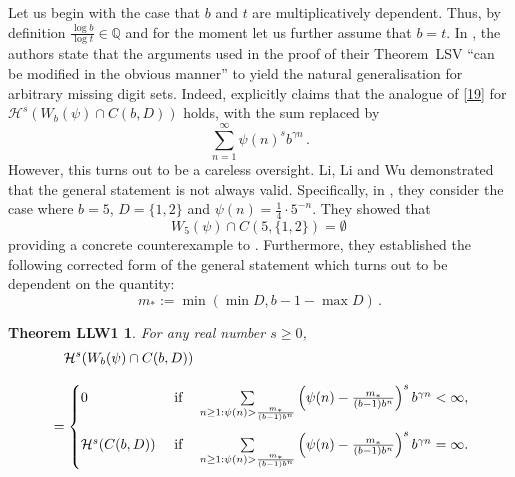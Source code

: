 \documentclass[12pt]{article}
\newtheorem*{llw1thm}{Theorem LLW1}
\theoremstyle{definition}
\theoremstyle{remark}
\begin{document}
Let us begin with the case that $b$ and $t$ are multiplicatively dependent.  Thus,  by definition $\frac{\log b}{\log t}\in\mathbb{Q}$ and for the moment let us further assume that $b=t$. In  \cite[\S7]{LSV2007}, the authors state  that the arguments used in the proof of their  Theorem~LSV ``can be modified in the obvious manner'' to yield the natural generalisation for arbitrary missing digit sets. Indeed, \cite[Theorem~4]{LSV2007} explicitly claims  that the analogue of \eqref{19} for $\mathcal{H}^{s}(W_{b}(\psi)\cap C(b,D))$  holds,  with the  sum  replaced by
 \begin{equation}  \label{sumlsvwrong}
\sum_{n=1}^{\infty}\psi(n)^{s}b^{\gamma n}  \, .  \end{equation}  However,  this turns out to be a careless oversight.
Li, Li and Wu \cite{LLW2025} demonstrated  that the general statement is not always valid.   Specifically, in   \cite[Example 3.1]{LLW2025}, they consider the case where   $b=5$, $D=\{1,2\}$ and $\psi(n)=\frac{1}{4}\cdot5^{-n}$.  They showed that
$$W_{5}(\psi)\cap C(5,\{1,2\})=\emptyset  \, $$
providing a concrete counterexample  to  \cite[Theorem~4]{LSV2007}.  Furthermore, they established  the following corrected form of the general statement which turns out to be  dependent on the quantity:
\begin{equation} \label{quantm}
m_{*}:=\min\left(\min D,b-1-\max D\right)  \, .
\end{equation}
 

\bigskip

\begin{llw1thm}
For any real number $s\geq0 $,
\begin{equation} \label{sumllw1}
\begin{aligned}
&\quad\mathcal{H}^{s}(W_{b}(\psi)\cap C(b,D)) \\[2ex] &%
=  \begin{cases} 0  \ &{\rm if}\quad
\sum\limits_{n\geq1: \psi(n)>\frac{m_{*}}{(b-1)b^{n}}}\left(\psi(n) -\frac{m_{*}}{(b-1)b^{n}}\right)^{s}b^{\gamma n}<\infty, \\[4ex]
\mathcal{H}^{s}(C(b,D)) \ &{\rm if}\quad \sum\limits_{n\geq1: \psi(n) >\frac{m_{*}}{(b-1)b^{n}}}\left(\psi(n) -\frac{m_{*}}{(b-1)b^{n}}\right)^{s}b^{\gamma n}=\infty. \end{cases}
\end{aligned}
\end{equation}
\end{llw1thm}
\end{document}
